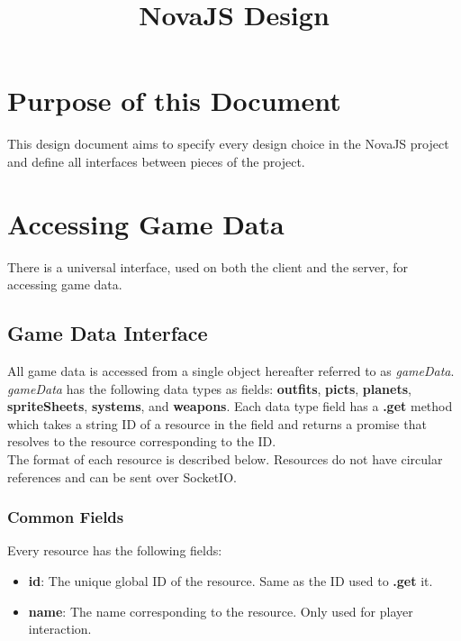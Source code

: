 \documentclass{article}
\title{NovaJS Design}
\newcommand{\gameData}{\emph{gameData}\xspace}
\begin{document}
\maketitle

\section{Purpose of this Document}
This design document aims to specify every design choice in the NovaJS project and define all interfaces between pieces of the project.

\section{Accessing Game Data}

There is a universal interface, used on both the client and the server, for accessing game data.
\subsection{Game Data Interface}

All game data is accessed from a single object hereafter referred to as \gameData. \gameData has the following data types as fields: \textbf{outfits}, \textbf{picts}, \textbf{planets}, \textbf{spriteSheets}, \textbf{systems}, and \textbf{weapons}. Each data type field has a \textbf{.get} method which takes a string ID of a resource in the field and returns a promise that resolves to the resource corresponding to the ID.\\

The format of each resource is described below. Resources do not have circular references and can be sent over SocketIO.
\subsubsection{Common Fields}
Every resource has the following fields:
\begin{itemize}
\item{\textbf{id}}: The unique global ID of the resource. Same as the ID used to \textbf{.get} it.
\item{\textbf{name}}: The name corresponding to the resource. Only used for player interaction.

\end{itemize}
\end{document}
